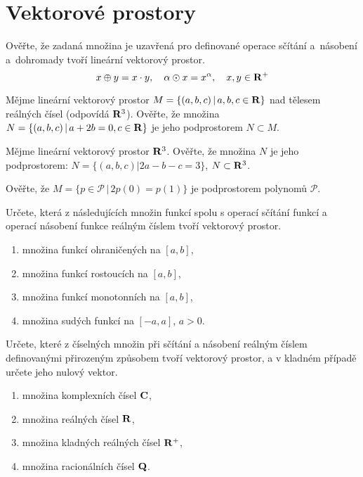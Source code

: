 \documentclass[a4paper,10pt]{book}
\def\Real{{\rm\bf R}}
\def\Rd{{{\rm\bf R}^{\rm 3}}}
\def\where{\,|\,}                    %
\begin{document}
\section{Vektorové prostory}
\exercise \label{ex:vek1} Ověřte, že zadaná množina je uzavřená pro definované operace sčítání a~násobení a~dohromady tvoří lineární vektorový prostor. 
\begin{equation}
  x\oplus y=x\cdot y, \quad \alpha \odot x = x^\alpha, \quad x,y \in \Real^{+}  \nonumber
\end{equation}

\exercise \label{ex:vek2} Mějme lineární vektorový prostor $M=\{(a,b,c)\where a,b,c\in\Real\}$ nad tělesem reálných čísel (odpovídá $\Rd$). 
Ověřte, že množina $N=\{(a,b,c)\where a+2b=0, c\in\Real\}$ je jeho podprostorem $N\subset M$. 

\exercise \label{ex:vek3} Mějme lineární vektorový prostor $\Rd$. Ověřte, že množina $N$ je jeho podprostorem: $N=\{(a,b,c)| 2a-b-c=3\}$, $N\subset \Rd$.

\exercise \label{ex:vek4} Ověřte, že $M=\{p\in\mathcal{P}\where 2p(0)=p(1)\}$ je podprostorem polynomů $\mathcal{P}$.

\exercise \label{ex:vek5} Určete, která z následujících množin funkcí spolu s operací sčítání
funkcí a operací násobení funkce reálným číslem tvoří vektorový prostor.
\begin{enumerate}[label=\alph*)]
\item množina funkcí ohraničených na $[a, b]$,
\item množina funkcí rostoucích na $[a, b]$,
\item množina funkcí monotonních na $[a, b]$,
\item množina sudých funkcí na $[-a, a]$, $a > 0$.
\end{enumerate}

\exercise \label{ex:vek6} Určete, které z číselných množin při sčítání a násobení reálným číslem definovanými
přirozeným způsobem tvoří vektorový prostor, a v kladném případě určete jeho nulový
vektor.
\begin{enumerate}[label=\alph*)]
\item množina komplexních čísel $\rm\bf{C}$,
\item množina reálných čísel $\Real$,
\item množina kladných reálných čísel $\Real^+$,
\item množina racionálních čísel $\rm\bf{Q}$.
\end{enumerate}
\end{document}
